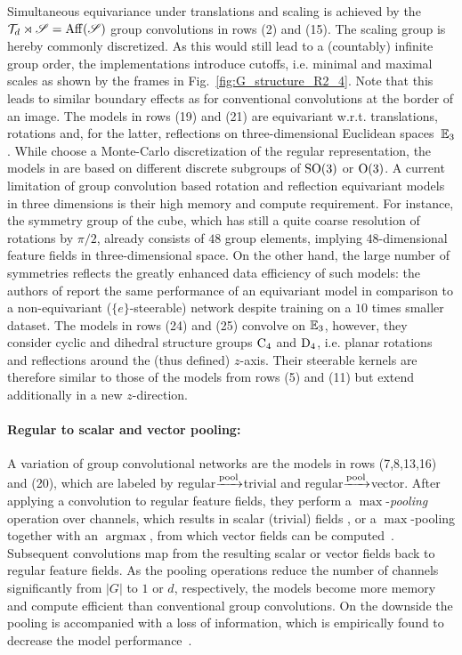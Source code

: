 % 
Simultaneous equivariance under translations and scaling is achieved by the $\mathcal{T}_d \rtimes \mathscr{S} = \operatorname{Aff}(\mathscr{S})$ group convolutions in
rows (2) and (15).
The scaling group is hereby commonly discretized.
As this would still lead to a (countably) infinite group order, the implementations introduce cutoffs, i.e. minimal and maximal scales as shown by the frames in Fig.~\ref{fig:G_structure_R2_4}.
Note that this leads to similar boundary effects as for conventional convolutions at the border of an image.
% 
The models in
rows (19) and (21)
are equivariant w.r.t. translations, rotations and, for the latter, reflections on three-dimensional Euclidean spaces~$\mathbb{E}_3$.
While \citet{finzi2020generalizing} choose a Monte-Carlo discretization of the regular representation,
the models in \cite{Worrall2018-CUBENET,winkels3DGCNNsPulmonary2018} are based on different discrete subgroups of $\operatorname{SO}(3)$ or $\operatorname{O}(3)$.
A current limitation of group convolution based rotation and reflection equivariant models in three dimensions is their high memory and compute requirement.
For instance, the symmetry group of the cube, which has still a quite coarse resolution of rotations by $\pi/2$, already consists of $48$ group elements, implying $48$-dimensional feature fields in three-dimensional space.
On the other hand, the large number of symmetries reflects the greatly enhanced data efficiency of such models:
the authors of \cite{winkels3DGCNNsPulmonary2018} report the same performance of an equivariant model in comparison to a non-equivariant ($\{e\}$-steerable) network despite training on a $10$ times smaller dataset.
% 
The models in
rows (24) and (25)
convolve on $\mathbb{E}_3$, however, they consider cyclic and dihedral structure groups $\operatorname{C}_{4}$ and $\operatorname{D}_{4}$, i.e. planar rotations and reflections around the (thus defined) $z$-axis.
Their steerable kernels are therefore similar to those of the models from
rows (5) and (11)
but extend additionally in a new $z$-direction.


\paragraph{Regular to scalar and vector pooling:}
A variation of group convolutional networks are the models in
rows (7,8,13,16) and (20),
which are labeled by regular$\xrightarrow{\textup{pool}}$trivial and regular$\xrightarrow{\textup{pool}}$vector.
After applying a convolution to regular feature fields, they perform a $\operatorname{max}$-\emph{pooling} operation over channels, which results in scalar (trivial) fields \cite{Cohen2016-GCNN,marcos2016learning,Weiler2019_E2CNN,ghosh2019scale,andrearczyk2019exploring}, or a $\operatorname{max}$-pooling together with an $\operatorname{argmax}$, from which vector fields can be computed~\cite{Marcos2017-VFN,Weiler2019_E2CNN}.
Subsequent convolutions map from the resulting scalar or vector fields back to regular feature fields.
As the pooling operations reduce the number of channels significantly from $|G|$ to $1$ or $d$, respectively, the models become more memory and compute efficient than conventional group convolutions.
On the downside the pooling is accompanied with a loss of information, which is empirically found to decrease the model performance~\cite{Weiler2019_E2CNN}.



